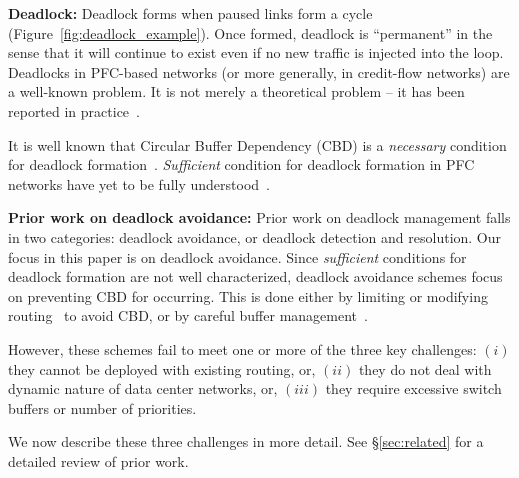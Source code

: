 {\bf Deadlock:} Deadlock forms when paused links form a cycle
(Figure~\ref{fig:deadlock_example}). Once formed,
deadlock is ``permanent'' in the sense that it will continue to exist even if no
new traffic is injected into the loop. Deadlocks in PFC-based networks (or more
generally, in credit-flow networks) are a well-known problem. It is not merely a
theoretical problem -- it has been reported in practice~\cite{rdmaatscale}.

It is well known that Circular Buffer Dependency (CBD) is a {\em necessary}
condition for deadlock formation~\cite{tcp-bolt,hu2016deadlocks}. {\em
Sufficient} condition for deadlock formation in PFC networks have yet to be
fully understood~\cite{hu2016deadlocks}. 

{\bf Prior work on deadlock avoidance:} Prior work on deadlock management falls
in two categories: deadlock avoidance, or deadlock detection and resolution. Our
focus in this paper is on deadlock avoidance.  Since {\em sufficient} conditions
for deadlock formation are not well characterized, deadlock avoidance schemes
focus on preventing CBD for occurring. This is done either by limiting or
modifying routing~\cite{tcpbolt} to avoid CBD, or by careful buffer
management~\cite{xxx}. 

However, these schemes fail to meet one or more of the three key challenges:
$(i)$ they cannot be deployed with existing routing, or, $(ii)$ they do not deal
with dynamic nature of data center networks, or, $(iii)$ they require excessive
switch buffers or number of priorities. 

We now describe these three challenges in more detail. See \S\ref{sec:related}
for a detailed review of prior work.


